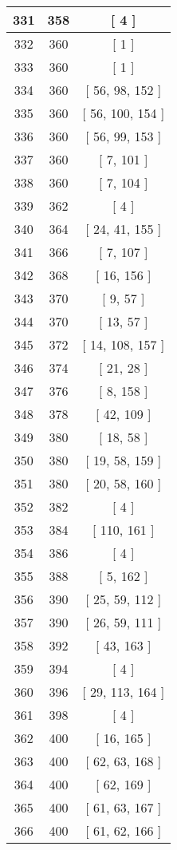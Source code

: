 \begin{center}
\begin{longtable}[H]{|| c c c ||}
331 & 358 & [ 4 ]
\\\hline
332 & 360 & [ 1 ]
\\\hline
333 & 360 & [ 1 ]
\\\hline
334 & 360 & [ 56, 98, 152 ]
\\\hline
335 & 360 & [ 56, 100, 154 ]
\\\hline
336 & 360 & [ 56, 99, 153 ]
\\\hline
337 & 360 & [ 7, 101 ]
\\\hline
338 & 360 & [ 7, 104 ]
\\\hline
339 & 362 & [ 4 ]
\\\hline
340 & 364 & [ 24, 41, 155 ]
\\\hline
341 & 366 & [ 7, 107 ]
\\\hline
342 & 368 & [ 16, 156 ]
\\\hline
343 & 370 & [ 9, 57 ]
\\\hline
344 & 370 & [ 13, 57 ]
\\\hline
345 & 372 & [ 14, 108, 157 ]
\\\hline
346 & 374 & [ 21, 28 ]
\\\hline
347 & 376 & [ 8, 158 ]
\\\hline
348 & 378 & [ 42, 109 ]
\\\hline
349 & 380 & [ 18, 58 ]
\\\hline
350 & 380 & [ 19, 58, 159 ]
\\\hline
351 & 380 & [ 20, 58, 160 ]
\\\hline
352 & 382 & [ 4 ]
\\\hline
353 & 384 & [ 110, 161 ]
\\\hline
354 & 386 & [ 4 ]
\\\hline
355 & 388 & [ 5, 162 ]
\\\hline
356 & 390 & [ 25, 59, 112 ]
\\\hline
357 & 390 & [ 26, 59, 111 ]
\\\hline
358 & 392 & [ 43, 163 ]
\\\hline
359 & 394 & [ 4 ]
\\\hline
360 & 396 & [ 29, 113, 164 ]
\\\hline
361 & 398 & [ 4 ]
\\\hline
362 & 400 & [ 16, 165 ]
\\\hline
363 & 400 & [ 62, 63, 168 ]
\\\hline
364 & 400 & [ 62, 169 ]
\\\hline
365 & 400 & [ 61, 63, 167 ]
\\\hline
366 & 400 & [ 61, 62, 166 ]
\\\hline

\end{longtable}
\end{center}

